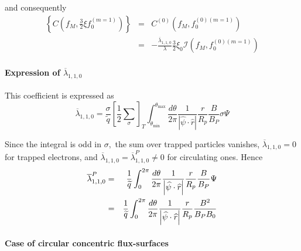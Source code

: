 and consequently
\begin{eqnarray}
\left\{ C\left( f_{M},\frac{3}{2}\xi f_{0}^{\left( m=1\right) }\right)
\right\} &=&C^{\left( 0\right) }\left( f_{M},f_{0}^{\left( 0\right) \left(
m=1\right) }\right)  \nonumber \\
&=&-\frac{\overline{\lambda }_{1,1,0}}{\lambda }\frac{3}{2}\xi _{0}\mathcal{I%
}\left( f_{M},f_{0}^{\left( 0\right) \left( m=1\right) }\right)
\end{eqnarray}

\paragraph{Expression of $\overline{\lambda }_{1,1,0}$}

This coefficient is expressed as
\begin{equation}
\overline{\lambda }_{1,1,0}=\frac{\sigma }{\widetilde{q}}\left[ \frac{1}{2}%
\sum_{\sigma }\right] _{T}\int_{\theta _{\min }}^{\theta _{\max }}\frac{
d\theta }{2\pi }\frac{1}{\left| \widehat{\psi }\cdot \widehat{r}\right| }%
\frac{r}{R_{p}}\frac{B}{B_{P}}\sigma \Psi
\end{equation}

Since the integral is odd in $\sigma ,$ the sum over trapped particles
vanishes, $\overline{\lambda }_{1,1,0}=0$ for trapped electrons, and $%
\overline{\lambda }_{1,1,0}=\overline{\lambda }_{1,1,0}^{P}\neq 0$ for
circulating ones. Hence
\begin{eqnarray}
\overline{\lambda }_{1,1,0}^{P} &=&\frac{1}{\widetilde{q}}\int_{0}^{2\pi }%
\frac{d\theta }{2\pi }\frac{1}{\left| \widehat{\psi }\cdot \widehat{r}%
\right| }\frac{r}{R_{p}}\frac{B}{B_{P}}\Psi   \nonumber \\
&=&\frac{1}{\widetilde{q}}\int_{0}^{2\pi }\frac{d\theta }{2\pi }\frac{1}{%
\left| \widehat{\psi }\cdot \widehat{r}\right| }\frac{r}{R_{p}}\frac{B^{2}}{%
B_{P}B_{0}}
\end{eqnarray}

\paragraph{Case of circular concentric flux-surfaces}

